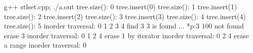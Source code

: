 {\footnotesize \begin{console} g++ stlset.cpp; ./a.out
tree.size(): 0
tree.insert(0)
tree.size(): 1
tree.insert(1)
tree.size(): 2
tree.insert(2)
tree.size(): 3
tree.insert(3)
tree.size(): 4
tree.insert(4)
tree.size(): 5
inorder traversal: 0 1 2 3 4 
find 3
3 is found ... *p:3
100 not found
erase 3
inorder traversal: 0 1 2 4 
erase 1 by iterator
inorder traversal: 0 2 4 
erase a range
inorder traversal: 0
\end{console}
}
